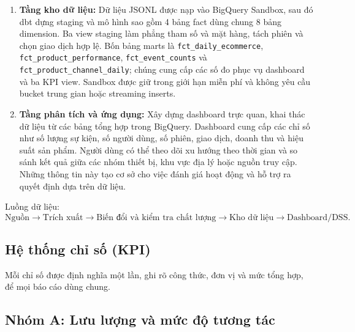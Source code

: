 \begin{enumerate}
    \item \textbf{Tầng kho dữ liệu:} Dữ liệu JSONL được nạp vào BigQuery Sandbox, sau đó dbt dựng staging và mô hình sao gồm 4 bảng fact dùng chung 8 bảng dimension. Ba view staging làm phẳng tham số và mặt hàng, tách phiên và chọn giao dịch hợp lệ. Bốn bảng marts là \texttt{fct\_daily\_ecommerce}, \texttt{fct\_product\_performance}, \texttt{fct\_event\_counts} và \texttt{fct\_product\_channel\_daily}; chúng cung cấp các số đo phục vụ dashboard và ba KPI view. Sandbox được giữ trong giới hạn miễn phí và không yêu cầu bucket trung gian hoặc streaming inserts.

    \item \textbf{Tầng phân tích và ứng dụng:} Xây dựng dashboard trực quan, khai thác dữ liệu từ các bảng tổng hợp trong BigQuery. Dashboard cung cấp các chỉ số như số lượng sự kiện, số người dùng, số phiên, giao dịch, doanh thu và hiệu suất sản phẩm. Người dùng có thể theo dõi xu hướng theo thời gian và so sánh kết quả giữa các nhóm thiết bị, khu vực địa lý hoặc nguồn truy cập. Những thông tin này tạo cơ sở cho việc đánh giá hoạt động và hỗ trợ ra quyết định dựa trên dữ liệu.
\end{enumerate}

Luồng dữ liệu:
\[
\text{Nguồn}
\rightarrow \text{Trích xuất}
\rightarrow \text{Biến đổi và kiểm tra chất lượng}
\rightarrow \text{Kho dữ liệu}
\rightarrow \text{Dashboard/DSS}.
\]

\subsection{Hệ thống chỉ số (KPI)}

Mỗi chỉ số được định nghĩa một lần, ghi rõ công thức, đơn vị và mức tổng hợp, để mọi báo cáo dùng chung.

\subsection*{Nhóm A: Lưu lượng và mức độ tương tác}

